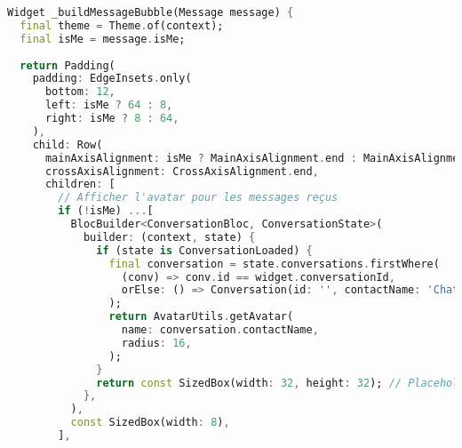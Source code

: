 \begin{lstlisting}[language=Dart, caption=Implémentation des bulles de messages, style=dartstyle]
Widget _buildMessageBubble(Message message) {
  final theme = Theme.of(context);
  final isMe = message.isMe;
  
  return Padding(
    padding: EdgeInsets.only(
      bottom: 12,
      left: isMe ? 64 : 8,
      right: isMe ? 8 : 64,
    ),
    child: Row(
      mainAxisAlignment: isMe ? MainAxisAlignment.end : MainAxisAlignment.start,
      crossAxisAlignment: CrossAxisAlignment.end,
      children: [
        // Afficher l'avatar pour les messages reçus
        if (!isMe) ...[
          BlocBuilder<ConversationBloc, ConversationState>(
            builder: (context, state) {
              if (state is ConversationLoaded) {
                final conversation = state.conversations.firstWhere(
                  (conv) => conv.id == widget.conversationId,
                  orElse: () => Conversation(id: '', contactName: 'Chat', lastMessage: '', timestamp: DateTime.now()),
                );
                return AvatarUtils.getAvatar(
                  name: conversation.contactName,
                  radius: 16,
                );
              }
              return const SizedBox(width: 32, height: 32); // Placeholder
            },
          ),
          const SizedBox(width: 8),
        ],
        

\end{lstlisting}
